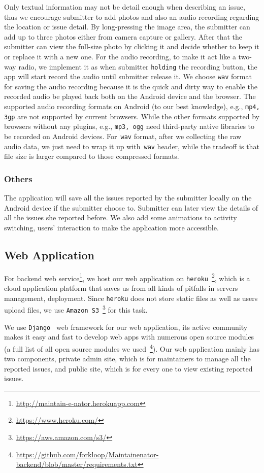 \documentclass{acm_proc_article-sp}
\begin{document}
Only textual information may not be detail enough when describing an issue, thus we encourage submitter to add photos and 
also an audio recording regarding the location or issue detail. By long-pressing the image area,
the submitter can add up to three photos either from camera capture or gallery. After that the submitter can view the full-size photo by
clicking it and decide whether to keep it or replace it with a new one. For the audio recording, to make it act like a two-way radio,
we implement it as when submitter \texttt{holding} the recording button, the app will start record the audio until submitter release it.
We choose \texttt{wav} format for saving the audio recording because it is the quick and dirty way to enable the recorded
audio be played back both on the Android device and the browser.
The supported audio recording formats on Android (to our best knowledge), e.g., \texttt{mp4, 3gp} are not supported by current browsers. 
While the other formats supported by browsers without any plugins, e.g., \texttt{mp3, ogg} need third-party native libraries to be recorded on Android devices. 
For~\texttt{wav} format, after we collecting the raw audio data, we just need to wrap it up with~\texttt{wav} header, 
while the tradeoff is that file size is larger compared to those compressed formats.

\subsubsection{Others}
The application will save all the issues reported by the submitter locally on the Android device if the submitter choose to. Submitter can later
view the details of all the issues she reported before. We also add some animations to activity switching, users' interaction to make the application more accessible.

\subsection{Web Application}
For backend web service\footnote{\url{http://maintain-e-nator.herokuapp.com}}, 
we host our web application on \texttt{heroku}~\footnote{\url{https://www.heroku.com/}}, which is a
cloud application platform that saves us from all kinds of pitfalls in servers management, deployment. 
Since \texttt{heroku} does not store static files as well as users upload files, 
we use \texttt{Amazon S3}~\footnote{\url{https://aws.amazon.com/s3/}} for this task.

We use \texttt{Django}~\cite{django} web framework for our web application, its active community makes it easy and fast to develop web apps 
with numerous open source modules 
(a full list of all open source modules we used~\footnote{\url{https://github.com/forkloop/Maintainenator-backend/blob/master/requirements.txt}}). 
Our web application mainly has two components, private admin site, which is for maintainers to
manage all the reported issues, and public site, which is for every one to view existing reported issues.
\end{document}
